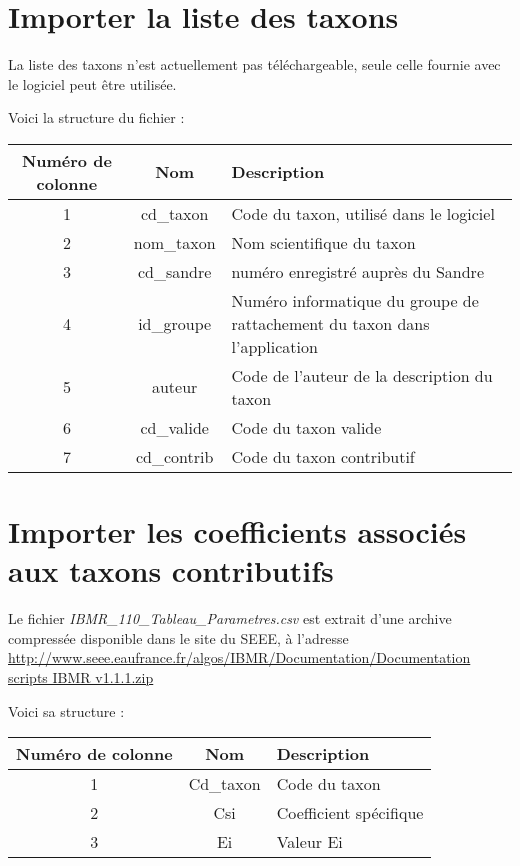 \section{Importer la liste des taxons}

La liste des taxons n'est actuellement pas téléchargeable, seule celle fournie avec le logiciel peut être utilisée.

Voici la structure du fichier :

\begin{tabular}{|c|c|>{\raggedright\arraybackslash}p{9cm}|}
\hline 
Numéro de colonne & Nom & Description \\ 
\hline 
1 & cd\_taxon & Code du taxon, utilisé dans le logiciel \\ 
\hline 
2 & nom\_taxon & Nom scientifique du taxon \\ 
\hline 
3 & cd\_sandre & numéro enregistré auprès du Sandre \\ 
\hline 
4 & id\_groupe & Numéro informatique du groupe de rattachement du taxon dans l'application \\ 
\hline 
5 & auteur & Code de l'auteur de la description du taxon \\ 
\hline 
6 & cd\_valide & Code du taxon valide \\ 
\hline 
7 & cd\_contrib & Code du taxon contributif \\ 
\hline 
\end{tabular} 

\section{Importer les coefficients associés aux taxons contributifs}

Le fichier \textit{IBMR\_110\_Tableau\_Parametres.csv} est extrait d'une archive compressée disponible dans le site du SEEE, à l'adresse \url{http://www.seee.eaufrance.fr/algos/IBMR/Documentation/Documentation scripts IBMR v1.1.1.zip}

Voici sa structure :

\begin{tabular}{|c|c|>{\raggedright\arraybackslash}p{9cm}|}
\hline 
Numéro de colonne & Nom & Description \\ 
\hline 
1 & Cd\_taxon & Code du taxon\\ 
\hline 
2 & Csi & Coefficient spécifique \\ 
\hline 
3 & Ei & Valeur Ei \\ 
\hline 
\end{tabular} 

